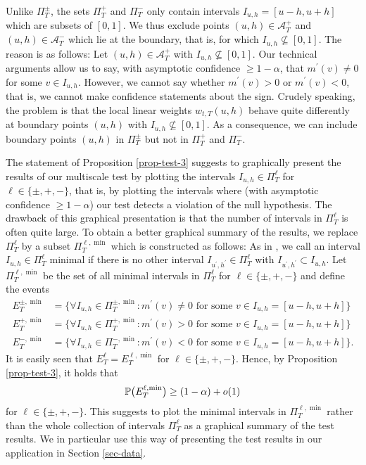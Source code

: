 \begin{remark}
Unlike $\Pi_T^\pm$, the sets $\Pi_T^+$ and $\Pi_T^-$ only contain intervals $I_{u,h} = [u-h,u+h]$ which are subsets of $[0,1]$. We thus exclude points $(u,h) \in \mathcal{A}_T^+$ and $(u,h) \in \mathcal{A}_T^-$ which lie at the boundary, that is, for which $I_{u,h} \nsubseteq [0,1]$. The reason is as follows: Let $(u,h) \in \mathcal{A}_T^+$ with $I_{u,h} \nsubseteq [0,1]$. Our technical arguments allow us to say, with asymptotic confidence $\ge 1 - \alpha$, that $m^\prime(v) \ne 0$ for some $v \in I_{u,h}$. However, we cannot say whether $m^\prime(v) > 0$ or $m^\prime(v) < 0$, that is, we cannot make confidence statements about the sign. Crudely speaking, the problem is that the local linear weights $w_{t,T}(u,h)$ behave quite differently at boundary points $(u,h)$ with $I_{u,h} \nsubseteq [0,1]$. As a consequence, we can include boundary points $(u,h)$ in $\Pi_T^\pm$ but not in $\Pi_T^+$ and $\Pi_T^-$.
\end{remark}
 

The statement of Proposition \ref{prop-test-3} suggests to graphically present the results of our multiscale test by plotting the intervals $I_{u,h} \in \Pi_T^\ell$ for $\ell \in \{\pm, +,-\}$, that is, by plotting the intervals where (with asymptotic confidence $\ge 1-\alpha$) our test detects a violation of the null hypothesis. The drawback of this graphical presentation is that the number of intervals in $\Pi_T^\ell$ is often quite large. To obtain a better graphical summary of the results, we replace $\Pi_T^\ell$ by a subset $\Pi_T^{\ell,\min}$ which is constructed as follows: As in \cite{Duembgen2002}, we call an interval $I_{u,h} \in \Pi_T^\ell$ minimal if there is no other interval $I_{u^\prime,h^\prime} \in \Pi_T^\ell$ with $I_{u^\prime,h^\prime} \subset I_{u,h}$. Let $\Pi_T^{\ell,\min}$ be the set of all minimal intervals in $\Pi_T^\ell$ for $\ell \in \{\pm, +,-\}$ and define the events
\begin{align*}
E_T^{\pm,\min} & = \Big\{ \forall I_{u,h} \in \Pi_T^{\pm,\min}: m^\prime(v) \ne 0 \text{ for some } v \in I_{u,h} = [u-h,u+h] \Big\} \\
E_T^{+,\min} & = \Big\{ \forall I_{u,h} \in \Pi_T^{+,\min}: m^\prime(v) > 0 \text{ for some } v \in I_{u,h} = [u-h,u+h] \Big\} \\ 
E_T^{-,\min} & = \Big\{ \forall I_{u,h} \in \Pi_T^{-,\min}: m^\prime(v) < 0 \text{ for some } v \in I_{u,h} = [u-h,u+h] \Big\}.  
\end{align*}
It is easily seen that $E_T^\ell = E_T^{\ell,\min}$ for $\ell \in \{\pm, +,-\}$. Hence, by Proposition \ref{prop-test-3}, it holds that 
\[ \mathbb{P} \big(E_T^{\ell,\min}\big) \ge (1-\alpha) + o(1) \] 
for $\ell \in \{\pm, +,-\}$. This suggests to plot the minimal intervals in $\Pi_T^{\ell,\min}$ rather than the whole collection of intervals $\Pi_T^\ell$ as a graphical summary of the test results. We in particular use this way of presenting the test results in our application in Section \ref{sec-data}.


